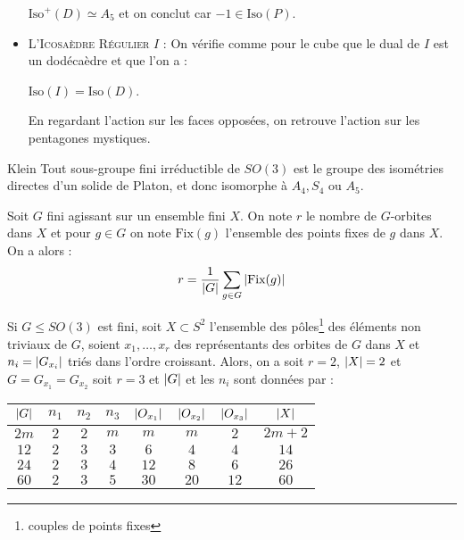 \documentclass{cours}
\begin{document}
\begin{center}
\begin{itemize}
              \begin{propositionfr}{}{}
                  $\text{Iso}^{+}(D) \simeq A_{5}$ et on conclut car $-1 \in \text{Iso}(P)$.
              \end{propositionfr}
        \item \textsc{L'Icosaèdre Régulier} $I$ : On vérifie comme pour le cube que le dual de $I$ est un dodécaèdre et que l'on a :
              \begin{propositionfr}{}{}
                  $\text{Iso}(I) = \text{Iso}(D)$.
              \end{propositionfr}
              En regardant l'action sur les faces opposées, on retrouve l'action sur les pentagones mystiques.
    \end{itemize}
\end{center}

\begin{théorème}{Klein}{}
    Tout sous-groupe fini irréductible de $SO(3)$ est le groupe des isométries directes d'un solide de Platon, et donc isomorphe à $A_{4}, S_{4}$ ou $A_{5}$.
\end{théorème}

\begin{lemma}
    Soit $G$ fini agissant sur un ensemble fini $X$. On note $r$ le nombre de $G$-orbites dans $X$ et pour $g \in G$ on note $\text{Fix}(g)$ l'ensemble des points fixes de $g$ dans $X$. On a alors :
    \[
        r = \frac{1}{\left|G\right|} \sum_{g \in G}  \left|\text{Fix}(g)\right|
    \]
\end{lemma}

\begin{lemma}
    Si $G \leq SO(3)$ est fini, soit $X \subset S^{2}$ l'ensemble des pôles\footnote{couples de points fixes} des éléments non triviaux de $G$, soient $x_{1}, \ldots, x_{r}$ des représentants des orbites de $G$ dans $X$ et $n_{i} = \left|G_{x_{i}}\right|$ triés dans l'ordre croissant. Alors, on a soit $r = 2$, $\left|X\right| = 2$ et $G = G_{x_{1}} = G_{x_{2}}$ soit $r = 3$ et $\left|G\right|$ et les $n_{i}$ sont données par :
    \begin{center}
        \begin{tabular}{cccccccc}
            $\left|G\right|$ & $n_{1}$ & $n_{2}$ & $n_{3}$ & $\left|O_{x_{1}}\right|$ & $\left|O_{x_{2}}\right|$ & $\left|O_{x_{3}}\right|$ & $\left|X\right|$ \\
            \midrule
            $2m$      & $2$     & $2$     & $m$     & $m$               & $m$               & $2$               & $2m+2$    \\
            \midrule
            $12$      & $2$     & $3$     & $3$     & $6$               & $4$               & $4$               & $14$      \\
            \midrule
            $24$      & $2$     & $3$     & $4$     & $12$              & $8$               & $6$               & $26$      \\
            \midrule
            $60$      & $2$     & $3$     & $5$     & $30$              & $20$              & $12$              & $60$
        \end{tabular}
    \end{center}
\end{lemma}
\end{document}
